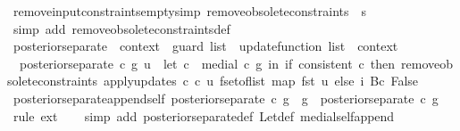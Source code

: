 \begin{isabellebody}
\isamarkupfalse%
\ remove{\isacharunderscore}input{\isacharunderscore}constraints{\isacharunderscore}empty{\isacharbrackleft}simp{\isacharbrackright}{\isacharcolon}\ {\isachardoublequoteopen}remove{\isacharunderscore}obsolete{\isacharunderscore}constraints\ {\isasymlbrakk}{\isasymrbrakk}\ s\ {\isacharequal}\ {\isasymlbrakk}{\isasymrbrakk}{\isachardoublequoteclose}\isanewline
%
\isadelimproof
\ \ %
\endisadelimproof
%
\isatagproof
{}\isamarkupfalse%
\ {\isacharparenleft}simp\ add{\isacharcolon}\ remove{\isacharunderscore}obsolete{\isacharunderscore}constraints{\isacharunderscore}def{\isacharparenright}%
\endisatagproof
{\isafoldproof}%
%
\isadelimproof
\isanewline
%
\endisadelimproof
\isanewline
{}\isamarkupfalse%
\ posterior{\isacharunderscore}separate\ {\isacharcolon}{\isacharcolon}\ {\isachardoublequoteopen}context\ {\isasymRightarrow}\ guard\ list\ {\isasymRightarrow}\ update{\isacharunderscore}function\ list\ {\isasymRightarrow}\ context{\isachardoublequoteclose}\ \ \isanewline
\ \ {\isachardoublequoteopen}posterior{\isacharunderscore}separate\ c\ g\ u\ {\isacharequal}\ {\isacharparenleft}let\ c{\isacharprime}\ {\isacharequal}\ {\isacharparenleft}medial\ c\ g{\isacharparenright}\ in\ {\isacharparenleft}if\ consistent\ c{\isacharprime}\ then\ remove{\isacharunderscore}obsolete{\isacharunderscore}constraints\ {\isacharparenleft}apply{\isacharunderscore}updates\ c{\isacharprime}\ c\ u{\isacharparenright}\ {\isacharparenleft}fset{\isacharunderscore}of{\isacharunderscore}list\ {\isacharparenleft}map\ fst\ u{\isacharparenright}{\isacharparenright}\ else\ {\isacharparenleft}{\isasymlambda}i{\isachardot}\ {\isacharbraceleft}{\isacharbar}Bc\ False{\isacharbar}{\isacharbraceright}{\isacharparenright}{\isacharparenright}{\isacharparenright}{\isachardoublequoteclose}\isanewline
\isanewline
{}\isamarkupfalse%
\ posterior{\isacharunderscore}separate{\isacharunderscore}append{\isacharunderscore}self{\isacharcolon}\ {\isachardoublequoteopen}posterior{\isacharunderscore}separate\ c\ {\isacharparenleft}g\ {\isacharat}\ g{\isacharparenright}\ {\isacharequal}\ posterior{\isacharunderscore}separate\ c\ g{\isachardoublequoteclose}\isanewline
%
\isadelimproof
\ \ %
\endisadelimproof
%
\isatagproof
{}\isamarkupfalse%
\ {\isacharparenleft}rule\ ext{\isacharparenright}\isanewline
\ \ \isamarkupfalse%
\ {\isacharparenleft}simp\ add{\isacharcolon}\ posterior{\isacharunderscore}separate{\isacharunderscore}def\ Let{\isacharunderscore}def\ medial{\isacharunderscore}self{\isacharunderscore}append{\isacharparenright}%

\end{isabellebody}
